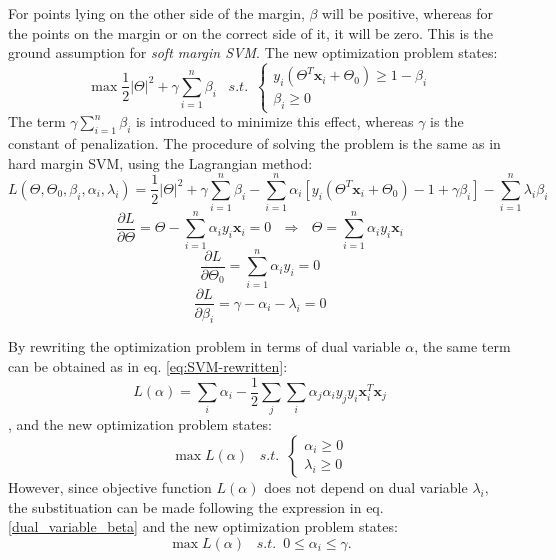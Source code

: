 For points lying on the other side of the margin, $\beta$ will be positive, whereas for the points on the margin or on the correct side of it, it will be zero. This is the ground assumption for \emph{soft margin SVM}. The new optimization problem states:
 \begin{equation} 
\max \frac{1}{2} \vert \Theta \vert ^2 + \gamma \sum_{i=1}^n \beta_i \,\,\,\,\, s.t. \,\,\, \left\{\begin{array}{lr} y_i \left(\Theta^T \mathbf{x}_i + \Theta_0\right) \geq 1 - \beta_i \\
\beta_i \geq 0  \end{array}\right.
\end{equation}
The term $\gamma \sum_{i=1}^n \beta_i$ is introduced to minimize this effect, whereas $\gamma$ is the constant of penalization. The procedure of solving the problem is the same as in hard margin SVM, using the Lagrangian method:
\begin{equation} 
L(\Theta, \Theta_0, \beta_i, \alpha_i, \lambda_i) = \frac{1}{2} \vert \Theta \vert ^2 + \gamma \sum_{i=1}^n \beta_i - \sum_{i=1}^n \alpha_i \left[y_i \left(\Theta^T \mathbf{x}_i + \Theta_0\right) - 1 + \gamma \beta_i \right] - \sum_{i=1}^n \lambda_i \beta_i
\end{equation}
\begin{equation}
\frac{\partial L}{\partial \Theta} = \Theta - \sum_{i=1}^n \alpha_i y_i \mathbf{x}_i = 0 \,\,\,\, \Rightarrow \,\,\,\, \Theta = \sum_{i=1}^n \alpha_i y_i \mathbf{x}_i
\end{equation}
\begin{equation}
\frac{\partial L}{\partial \Theta_0} = \sum_{i=1}^n \alpha_i y_i = 0
\end{equation}
\begin{equation} \label{dual_variable_beta}
\frac{\partial L}{\partial \beta_i} = \gamma - \alpha_i - \lambda_i = 0
\end{equation}

By rewriting the optimization problem in terms of dual variable $\alpha$, the same term can be obtained as in eq. \ref{eq:SVM-rewritten}:
\begin{equation} 
L(\alpha) = \sum_i \alpha_i - \frac{1}{2} \sum_j \sum_i \alpha_j \alpha_i y_j y_i \mathbf{x}_i^T \mathbf{x}_j
\end{equation}
, and the new optimization problem states:
\begin{equation} 
\max L(\alpha) \,\,\,\,\, s.t. \,\,\, \left\{\begin{array}{lr} \alpha_i \geq 0 \\
\lambda_i \geq 0  \end{array}\right.
\end{equation}
However, since objective function $L(\alpha)$ does not depend on dual variable $\lambda_i$, the substituation can be made following the expression in eq. \ref{dual_variable_beta} and the new optimization problem states:
 \begin{equation} 
\max L(\alpha) \,\,\,\,\, s.t. \,\,\, 0 \leq \alpha_i \leq \gamma.
\end{equation}

